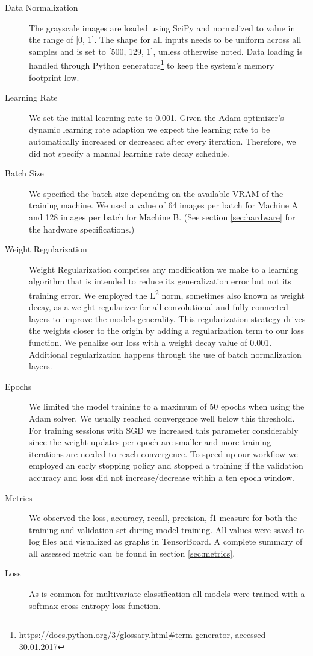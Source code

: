 \begin{description}
	\item[Data Normalization] The grayscale images are loaded using SciPy and normalized to value in the range of [0, 1]. The shape for all inputs needs to be uniform across all samples and is set to [500, 129, 1], unless otherwise noted. Data loading is handled through Python generators\footnote{\url{https://docs.python.org/3/glossary.html\#term-generator}, accessed 30.01.2017} to keep the system's memory footprint low.
	\item[Learning Rate] We set the initial learning rate to 0.001. Given the Adam optimizer's dynamic learning rate adaption we expect the learning rate to be automatically increased or decreased after every iteration. Therefore, we did not specify a manual learning rate decay schedule.
	\item[Batch Size] We specified the batch size depending on the available VRAM of the training machine. We used a value of 64 images per batch for Machine A and 128 images per batch for Machine B. (See section \ref{sec:hardware} for the hardware specifications.) 
	\item[Weight Regularization] Weight Regularization comprises any modification we make to a learning algorithm that is intended to reduce its generalization error but not its training error. We employed the L\textsuperscript{2} norm\cite[chapter 7.1.1, p. 231]{Goodfellow-et-al-2016}, sometimes also known as weight decay, as a weight regularizer for all convolutional and fully connected layers to improve the models generality. This regularization strategy drives the weights closer to the origin by adding a regularization term to our loss function. We penalize our loss with a weight decay value of 0.001. Additional regularization happens through the use of batch normalization layers.
	\item[Epochs] We limited the model training to a maximum of 50 epochs when using the Adam solver. We usually reached convergence well below this threshold. For training sessions with SGD we increased this parameter considerably since the weight updates per epoch are smaller and more training iterations are needed to reach convergence. To speed up our workflow we employed an early stopping policy and stopped a training if the validation accuracy and loss did not increase/decrease within a ten epoch window.
	\item[Metrics] We observed the loss, accuracy, recall, precision, f1 measure for both the training and validation set during model training. All values were saved to log files and visualized as graphs in TensorBoard. A complete summary of all assessed metric can be found in section \ref{sec:metrics}.
	\item[Loss] As is common for multivariate classification all models were trained with a softmax cross-entropy loss function. 
	\end{description}



